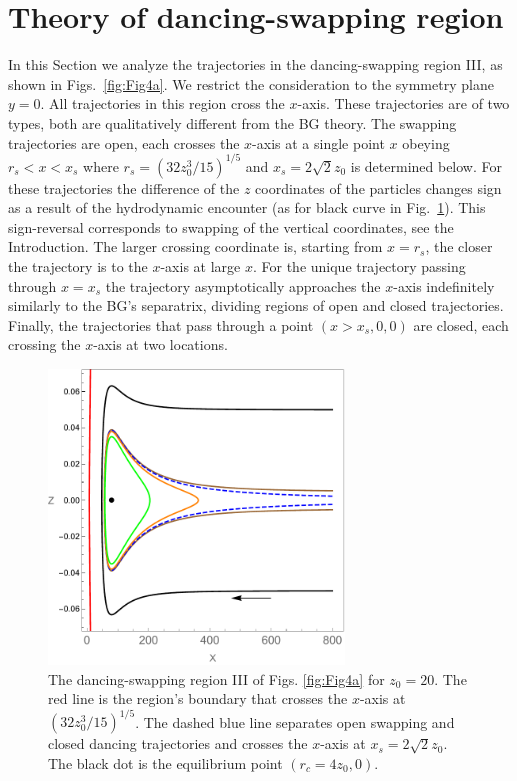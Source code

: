 \section{Theory of dancing-swapping region}\label{dancing-swapping}

In this Section we analyze the trajectories in the dancing-swapping region III, as shown in Figs.~\ref{fig:Fig4a}. We restrict the consideration to the symmetry plane $y=0$. All trajectories in this region cross the $x$-axis. These trajectories are of two types, both are qualitatively different from the BG theory. The swapping trajectories are open, each crosses the $x$-axis at a single point $x$ obeying $r_s<x<x_s$ where $r_s=\left(32 z_0^3/15\right)^{1/5}$ and $x_s=2\sqrt{2}z_0$ is determined below. For these trajectories the difference of the $z$ coordinates of the particles changes sign as a result of the hydrodynamic encounter (as for black curve in Fig.~\ref{Separatrix2D}). This sign-reversal corresponds to swapping of the vertical coordinates, see the Introduction. The larger crossing coordinate is, starting from $x=r_s$, the closer the trajectory is to the $x$-axis at large $x$. For the unique trajectory passing through $x=x_s$ the trajectory asymptotically approaches the $x$-axis indefinitely similarly to the BG's separatrix, dividing regions of open and closed trajectories. Finally, the trajectories that pass through a point $(x>x_s, 0, 0)$ are closed, each crossing the $x$-axis at two locations.
%
\begin{figure}%
\begin{center}
\includegraphics[width=0.7\textwidth]{Fig5_inset.pdf}
\end{center}
\caption{The dancing-swapping region III of Figs. \ref{fig:Fig4a} for $z_0=20$. The red line is the region's boundary that crosses the $x$-axis at $\left(32 z_0^3/15\right)^{1/5}$. The dashed blue line separates open swapping and closed dancing trajectories and crosses the $x$-axis at $x_s=2\sqrt{2}z_0$. The black dot is the equilibrium point $(r_c=4z_0, 0)$.}
\label{Separatrix2D}
\end{figure}

